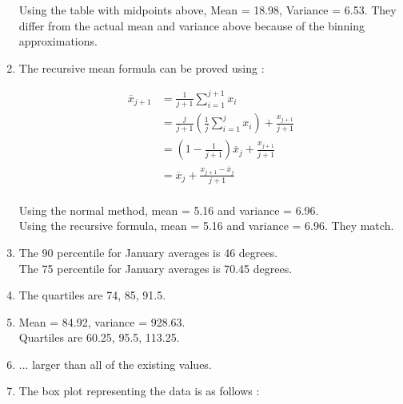 \begin{enumerate}
	Using the table with midpoints above, Mean = 18.98, Variance = 6.53. They differ from the actual mean and variance above because of the binning approximations.
	
	\item The recursive mean formula can be proved using : 
	
	\begin{subequations}
		\begin{align}
			\overline{x}_{j + 1} &= \frac{1}{j + 1} \sum\limits_{i = 1}^{j + 1} x_{i} \\
			& = \frac{j}{j + 1} \left( \frac{1}{j} \sum\limits_{i = 1}^{j} x_{i} \right) + \frac{x_{j + 1}}{j + 1} \\
			& = \left( 1 - \frac{1}{j + 1} \right) \overline{x}_{j} + \frac{x_{j + 1}}{j + 1} \\
			& = \overline{x}_{j} + \frac{x_{j + 1} - \overline{x}_{j}}{j + 1}
		\end{align}
	\end{subequations} \\
	
	Using the normal method, mean = 5.16 and variance = 6.96. \\
	Using the recursive formula, mean = 5.16 and variance = 6.96. They match. \\
	
	\item The 90 percentile for January averages is 46 degrees. \\
	The 75 percentile for January averages is 70.45 degrees.
	
	\item The quartiles are 74, 85, 91.5.\\
	
	\item Mean = 84.92, variance = 928.63. \\
	Quartiles are 60.25, 95.5, 113.25. \\
	
	\item ... larger than all of the existing values. \\
	
	\item The box plot representing the data is as follows : \\
	
	\begin{figure}[H]
		\centering
	\end{figure}
	

\end{enumerate}
